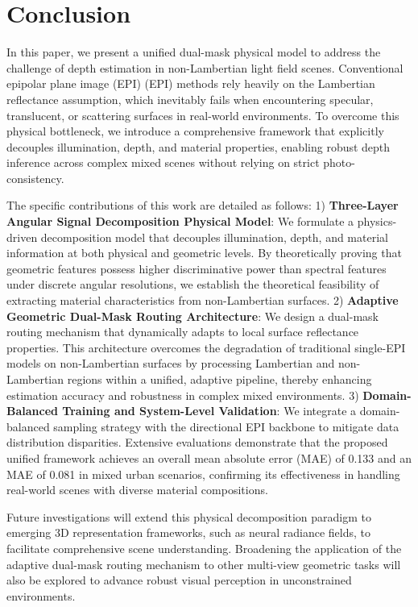 \section{Conclusion}


In this paper, we present a unified dual-mask physical model to address the challenge of depth estimation in non-Lambertian light field scenes. Conventional epipolar plane image (EPI) (EPI) methods rely heavily on the Lambertian reflectance assumption, which inevitably fails when encountering specular, translucent, or scattering surfaces in real-world environments. To overcome this physical bottleneck, we introduce a comprehensive framework that explicitly decouples illumination, depth, and material properties, enabling robust depth inference across complex mixed scenes without relying on strict photo-consistency.

The specific contributions of this work are detailed as follows:
1) \textbf{Three-Layer Angular Signal Decomposition Physical Model}: We formulate a physics-driven decomposition model that decouples illumination, depth, and material information at both physical and geometric levels. By theoretically proving that geometric features possess higher discriminative power than spectral features under discrete angular resolutions, we establish the theoretical feasibility of extracting material characteristics from non-Lambertian surfaces.
2) \textbf{Adaptive Geometric Dual-Mask Routing Architecture}: We design a dual-mask routing mechanism that dynamically adapts to local surface reflectance properties. This architecture overcomes the degradation of traditional single-EPI models on non-Lambertian surfaces by processing Lambertian and non-Lambertian regions within a unified, adaptive pipeline, thereby enhancing estimation accuracy and robustness in complex mixed environments.
3) \textbf{Domain-Balanced Training and System-Level Validation}: We integrate a domain-balanced sampling strategy with the directional EPI backbone to mitigate data distribution disparities. Extensive evaluations demonstrate that the proposed unified framework achieves an overall mean absolute error (MAE) of 0.133 and an MAE of 0.081 in mixed urban scenarios, confirming its effectiveness in handling real-world scenes with diverse material compositions.

Future investigations will extend this physical decomposition paradigm to emerging 3D representation frameworks, such as neural radiance fields, to facilitate comprehensive scene understanding. Broadening the application of the adaptive dual-mask routing mechanism to other multi-view geometric tasks will also be explored to advance robust visual perception in unconstrained environments.



